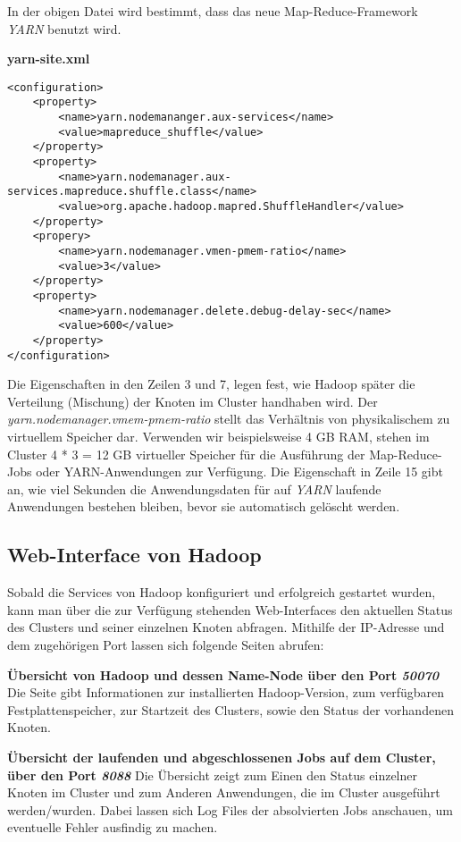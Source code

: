 In der obigen Datei wird bestimmt, dass das neue Map-Reduce-Framework \textit{YARN} benutzt wird.

\textbf{yarn-site.xml}

\lstset{language=XML}

\begin{lstlisting}
<configuration>
	<property>
		<name>yarn.nodemananger.aux-services</name>
		<value>mapreduce_shuffle</value>
	</property>
	<property>
		<name>yarn.nodemanager.aux-services.mapreduce.shuffle.class</name>
		<value>org.apache.hadoop.mapred.ShuffleHandler</value>
	</property>
	<propery>
		<name>yarn.nodemanager.vmen-pmem-ratio</name>
		<value>3</value>
	</property>
	<property>
		<name>yarn.nodemanager.delete.debug-delay-sec</name>
		<value>600</value>
	</property>
</configuration>
\end{lstlisting}

Die Eigenschaften in den Zeilen 3 und 7, legen fest, wie Hadoop später die Verteilung (Mischung) der Knoten im Cluster handhaben wird. Der \textit{yarn.nodemanager.vmem-pmem-ratio} stellt das Verhältnis von physikalischem zu virtuellem Speicher dar. Verwenden wir beispielsweise 4 GB RAM, stehen im Cluster 4 * 3 = 12 GB virtueller Speicher für die Ausführung der Map-Reduce-Jobs oder YARN-Anwendungen zur Verfügung. Die Eigenschaft in Zeile 15 gibt an, wie viel Sekunden die Anwendungsdaten für auf \textit{YARN} laufende Anwendungen bestehen bleiben, bevor sie automatisch gelöscht werden. 


\pagebreak

\subsection{Web-Interface von Hadoop}
\label{subsec:webinterface}

Sobald die Services von Hadoop konfiguriert und erfolgreich gestartet wurden, kann man über die zur Verfügung stehenden Web-Interfaces den aktuellen Status des Clusters und seiner einzelnen Knoten abfragen. Mithilfe der IP-Adresse und dem zugehörigen Port lassen sich folgende Seiten abrufen:

\textbf{Übersicht von Hadoop und dessen Name-Node über den Port \textit{50070}}
Die Seite gibt Informationen zur installierten Hadoop-Version, zum verfügbaren Festplattenspeicher, zur Startzeit des Clusters, sowie den Status der vorhandenen Knoten.

\textbf{Übersicht der laufenden und abgeschlossenen Jobs auf dem Cluster, über den Port  \textit{8088}}
Die Übersicht zeigt zum Einen den Status einzelner Knoten im Cluster und zum Anderen Anwendungen, die im Cluster ausgeführt werden/wurden. Dabei lassen sich Log Files der absolvierten Jobs anschauen, um eventuelle Fehler ausfindig zu machen.

